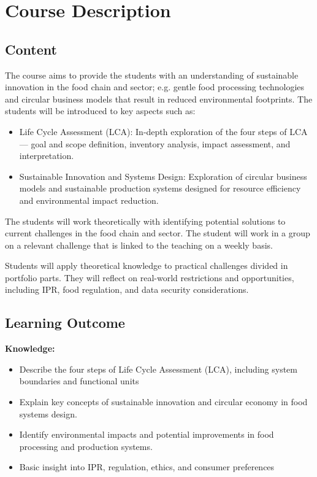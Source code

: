 \chapter*{Course Description}
\setlength{\headheight}{12.71342pt}
\addtolength{\topmargin}{-0.71342pt}

\section*{Content}
The course aims to provide the students with an understanding of sustainable innovation in the food chain and sector; e.g. gentle food processing technologies and circular business models that result in reduced environmental footprints. The students will be introduced to key aspects such as:
\begin{itemize}
    \item Life Cycle Assessment (LCA): In-depth exploration of the four steps of LCA— goal and scope definition, inventory analysis, impact assessment, and interpretation.
    \item Sustainable Innovation and Systems Design: Exploration of circular business models and sustainable production systems designed for resource efficiency and environmental impact reduction.
\end{itemize} 

The students will work theoretically with identifying potential solutions to current challenges in the food chain and sector. The student will work in a group on a relevant challenge that is linked to the teaching on a weekly basis. 

Students will apply theoretical knowledge to practical challenges divided in portfolio parts. They will reflect on real-world restrictions and opportunities, including IPR, food regulation, and data security considerations. 

\section*{Learning Outcome}
\textbf{Knowledge:}
\begin{itemize}
    \item Describe the four steps of Life Cycle Assessment (LCA), including system boundaries and functional units
    \item Explain key concepts of sustainable innovation and circular economy in food systems design.
    \item Identify environmental impacts and potential improvements in food processing and production systems.
    \item Basic insight into IPR, regulation, ethics, and consumer preferences
\end{itemize}

